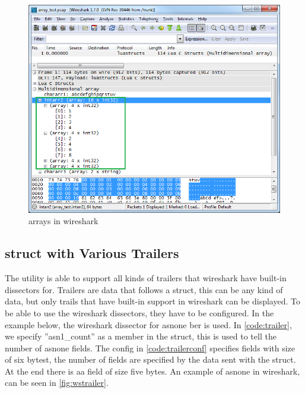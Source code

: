 \begin{figure}[ht]
	\center
	\includegraphics[width=\textwidth]{./sprints/img/wireshark_array}
	\caption{\Glspl{array} in \Gls{wireshark}\label{fig:wsarray}}
\end{figure}

\subsection{\Gls{struct} with Various Trailers}
The \gls{utility} is able to support all kinds of \gls{trailers} that \Gls{wireshark} have 
built-in \glspl{dissector} for. Trailers are data that follows a \gls{struct}, this can be 
any kind of data, but only trails that have built-in support in \Gls{wireshark} can 
be displayed.  To be able to use the \Gls{wireshark} \glspl{dissector}, they have to be 
configured. In the example below, the \Gls{wireshark} \gls{dissector} for \gls{asnone} 
\gls{ber} is used.  In \autoref{code:trailer}, we 
specify ''asn1\_count'' as a \gls{member} in the \gls{struct}, this is used to tell the 
number of \gls{asnone} fields. The config in  \autoref{code:trailerconf} specifies 
fields with size of six bytest, the number of fields are specified by the data 
sent with the \gls{struct}. At the end there is aa field of size five bytes. An 
example of \gls{asnone} in \Gls{wireshark}, can be seen in \autoref{fig:wstrailer}.

